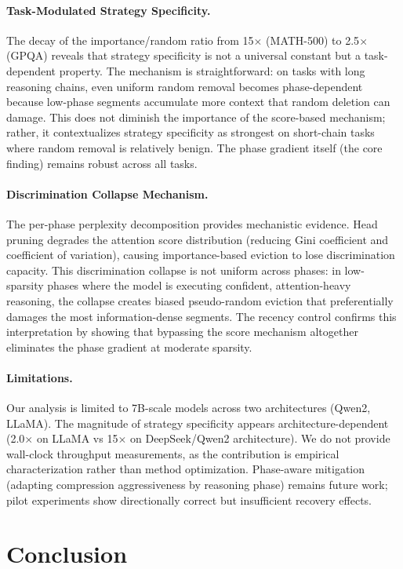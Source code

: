 \documentclass[11pt,a4paper]{article}
\begin{document}
\paragraph{Task-Modulated Strategy Specificity.} The decay of the importance/random ratio from 15$\times$ (MATH-500) to 2.5$\times$ (GPQA) reveals that strategy specificity is not a universal constant but a task-dependent property. The mechanism is straightforward: on tasks with long reasoning chains, even uniform random removal becomes phase-dependent because low-phase segments accumulate more context that random deletion can damage. This does not diminish the importance of the score-based mechanism; rather, it contextualizes strategy specificity as strongest on short-chain tasks where random removal is relatively benign. The phase gradient itself (the core finding) remains robust across all tasks.

\paragraph{Discrimination Collapse Mechanism.} The per-phase perplexity decomposition provides mechanistic evidence. Head pruning degrades the attention score distribution (reducing Gini coefficient and coefficient of variation), causing importance-based eviction to lose discrimination capacity. This discrimination collapse is not uniform across phases: in low-sparsity phases where the model is executing confident, attention-heavy reasoning, the collapse creates biased pseudo-random eviction that preferentially damages the most information-dense segments. The recency control confirms this interpretation by showing that bypassing the score mechanism altogether eliminates the phase gradient at moderate sparsity.

\paragraph{Limitations.} Our analysis is limited to 7B-scale models across two architectures (Qwen2, LLaMA). The magnitude of strategy specificity appears architecture-dependent (2.0$\times$ on LLaMA vs 15$\times$ on DeepSeek/Qwen2 architecture). We do not provide wall-clock throughput measurements, as the contribution is empirical characterization rather than method optimization. Phase-aware mitigation (adapting compression aggressiveness by reasoning phase) remains future work; pilot experiments show directionally correct but insufficient recovery effects.

\section{Conclusion}
\end{document}
